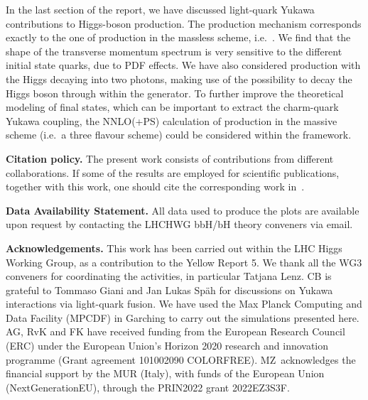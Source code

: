 \documentclass[11pt,a4paper]{article}
\begin{document}
In the last section of the report, we have discussed light-quark Yukawa contributions
to Higgs-boson production. The production mechanism corresponds exactly to 
the one of \bbH{} production in the massless scheme, i.e.\ \qqtoH{}. We find that 
the shape of the transverse momentum spectrum is very sensitive to the different 
initial state quarks, due to PDF effects. We have also considered 
\qqtoH{} production with the Higgs decaying into two photons, 
making use of the possibility to decay the Higgs boson through 
within the \minnlo{} generator. To further improve the theoretical modeling
of \ccH{} final states, which can be important to extract the charm-quark Yukawa coupling, 
the NNLO(+PS) calculation of \ccH{} production in the massive scheme (i.e.\ a three 
flavour scheme) could be considered within the \minnlo{} framework.

\textbf{Citation policy. }The present work consists of contributions from different collaborations. If some of the results are employed for scientific publications, together with this work, one should cite the corresponding work in~.

\textbf{Data Availability Statement.} All data used to produce the plots are available upon request by contacting the LHCHWG bbH/bH theory conveners via email.

\textbf{Acknowledgements. }This work has been carried out within the LHC Higgs Working Group, as a contribution to the Yellow Report 5. We thank all the WG3 conveners for coordinating the activities, in particular Tatjana Lenz. CB is grateful to Tommaso Giani and Jan Lukas Sp\"ah for discussions on Yukawa interactions via light-quark fusion. We have used the Max Planck Computing and Data Facility (MPCDF) in Garching to carry out the \minnlo{} simulations presented here. 
AG, RvK and FK have received funding from the European Research Council (ERC) under the European Union's Horizon 2020 research and innovation programme (Grant agreement 101002090 COLORFREE).
MZ~acknowledges the financial support by the MUR (Italy), with
funds of the European Union (NextGenerationEU), through the PRIN2022
grant 2022EZ3S3F.



\end{document}
